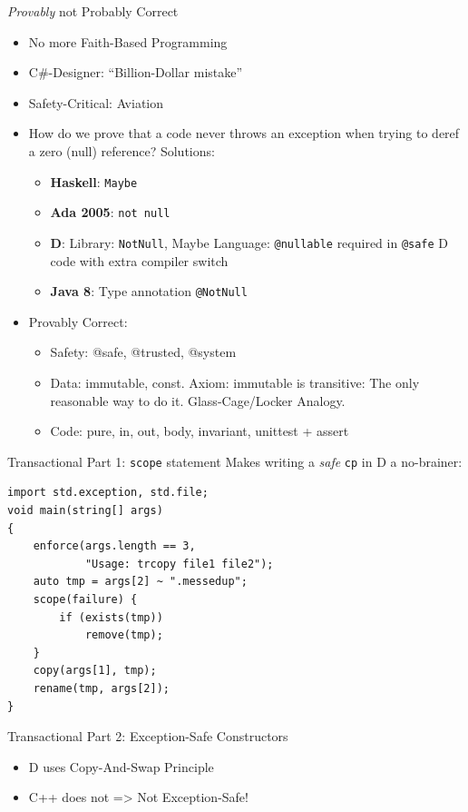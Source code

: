 \documentclass[xcolor=dvipsnames]{beamer}
\begin{document}
\begin{frame}[fragile]{\emph{Provably} not Probably Correct}
  \begin{itemize}[<+->]
  \item No more Faith-Based Programming
  \item C\#-Designer: ``Billion-Dollar mistake''
  \item Safety-Critical: Aviation
  \item How do we prove that a code never throws an exception when trying to
    deref a zero (null) reference? Solutions:
    \begin{itemize}[<+->]
    \item \textbf{Haskell}: \texttt{Maybe}
    \item \textbf{Ada 2005}: \texttt{not null}
    \item \textbf{D}: Library: \texttt{NotNull}, Maybe Language:
      \texttt{@nullable} required in \texttt{@safe} D code with extra compiler
      switch
    \item \textbf{Java 8}: Type annotation \texttt{@NotNull}
    \end{itemize}
\item Provably Correct:
  \begin{itemize}[<+->]
  \item Safety: @safe, @trusted, @system
  \item Data: immutable, const. Axiom: immutable is transitive: The only
    reasonable way to do it. Glass-Cage/Locker Analogy.
  \item Code: pure, in, out, body, invariant, unittest + assert
  \end{itemize}
\end{itemize}
\end{frame}

\begin{frame}[fragile]{Transactional Part 1: \texttt{scope} statement}
Makes writing a \emph{safe} \texttt{cp} in D a no-brainer:
\begin{lstlisting}[frame=single]
import std.exception, std.file;
void main(string[] args)
{
    enforce(args.length == 3,
            "Usage: trcopy file1 file2");
    auto tmp = args[2] ~ ".messedup";
    scope(failure) {
        if (exists(tmp))
            remove(tmp);
    }
    copy(args[1], tmp);
    rename(tmp, args[2]);
}
\end{lstlisting}
\end{frame}

\begin{frame}[fragile]{Transactional Part 2: Exception-Safe Constructors}
  \begin{itemize}[<+->]
  \item D uses Copy-And-Swap Principle
  \item C++ does not => Not Exception-Safe!
  \end{itemize}
\end{frame}
\end{document}
